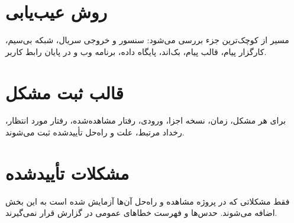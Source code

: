 \section{روش عیب‌یابی}
مسیر از کوچک‌ترین جزء بررسی می‌شود: سنسور و خروجی سریال، شبکه بی‌سیم، کارگزار پیام، قالب پیام، بک‌اند، پایگاه داده، برنامه وب و در پایان رابط کاربر.

\section{قالب ثبت مشکل}
برای هر مشکل، زمان، نسخه اجزا، ورودی، رفتار مشاهده‌شده، رفتار مورد انتظار، رخداد مرتبط، علت و راه‌حل تأییدشده ثبت می‌شوند.

\section{مشکلات تأییدشده}
فقط مشکلاتی که در پروژه مشاهده و راه‌حل آن‌ها آزمایش شده است به این بخش اضافه می‌شوند. حدس‌ها و فهرست خطاهای عمومی در گزارش قرار نمی‌گیرند.
